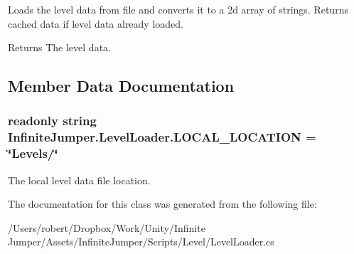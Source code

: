 Loads the level data from file and converts it to a 2d array of strings. Returns cached data if level data already loaded. 

\begin{DoxyReturn}{Returns}
The level data.
\end{DoxyReturn}


\subsection{Member Data Documentation}
\hypertarget{class_infinite_jumper_1_1_level_loader_ada02fbd93271e3cdaf750802fe62abff}{}
\subsubsection[{L\+O\+C\+A\+L\+\_\+\+L\+O\+C\+A\+T\+I\+O\+N}]{\setlength{\rightskip}{0pt plus 5cm}readonly string Infinite\+Jumper.\+Level\+Loader.\+L\+O\+C\+A\+L\+\_\+\+L\+O\+C\+A\+T\+I\+O\+N = \char`\"{}Levels/\char`\"{}\hspace{0.3cm}{\ttfamily [static]}}\label{class_infinite_jumper_1_1_level_loader_ada02fbd93271e3cdaf750802fe62abff}


The local level data file location. 



The documentation for this class was generated from the following file\+:\begin{DoxyCompactItemize}
\item 
/\+Users/robert/\+Dropbox/\+Work/\+Unity/\+Infinite Jumper/\+Assets/\+Infinite\+Jumper/\+Scripts/\+Level/Level\+Loader.\+cs\end{DoxyCompactItemize}
